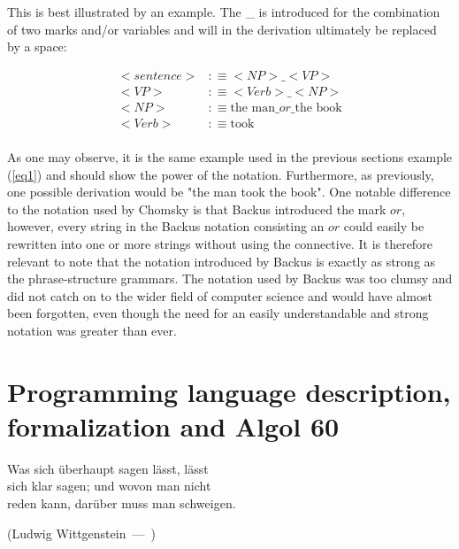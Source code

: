 \documentclass{article}
\let\oldquote\quote
\let\endoldquote\endquote
\renewenvironment{quote}[2][]
{\if\relax\detokenize{#1}\relax
	\def\quoteauthor{#2}%
	\else
	\def\quoteauthor{#2~---~#1}%
	\fi
	\oldquote}
{\par\nobreak\smallskip\hfill(\quoteauthor)%
	\endoldquote\addvspace{\bigskipamount}}
\begin{document}
This is best illustrated by an example. The \_ is introduced for the combination of two marks and/or variables and will in the derivation ultimately be replaced by a space:

\begin{equation} \label{eq2}
	\begin{split}
		<sentence> &:\equiv<NP>\_<VP> \\
		<VP> &:\equiv<Verb>\_<NP > \\
		<NP> &:\equiv\text{the man}\_or\_\text{the book} \\
		<Verb> &:\equiv\text{took} \\
	\end{split}
\end{equation}

As one may observe, it is the same example used in the previous sections example (\ref{eq1}) and should show the power of the notation. Furthermore, as previously, one possible derivation would be "the man took the book". One notable difference to the notation used by Chomsky is that Backus introduced the mark $or$, however, every string in the Backus notation consisting an $or$ could easily be rewritten into one or more strings without using the connective. It is therefore relevant to note that the notation introduced by Backus is exactly as strong as the phrase-structure grammars. The notation used by Backus was too clumsy and did not catch on to the wider field of computer science and would have almost been forgotten, even though the need for an easily understandable and strong notation was greater than ever.

\section{Programming language description, formalization and Algol 60}

\begin{quote}{Ludwig Wittgenstein}
	\begin{flushright}
		Was sich überhaupt sagen lässt, lässt \\ sich klar sagen; und wovon man nicht \\ reden kann, darüber muss man schweigen.
	\end{flushright}
\end{quote}
\end{document}
